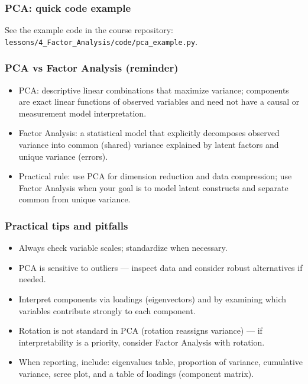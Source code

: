 \documentclass[aspectratio=169]{beamer}
\begin{document}
\begin{frame}[fragile]
\frametitle{PCA: quick code example}
See the example code in the course repository: \texttt{lessons/4\_Factor\_Analysis/code/pca\_example.py}.

\vspace{6pt}

\end{frame}

\begin{frame}
\frametitle{PCA vs Factor Analysis (reminder)}
\begin{itemize}
    \item PCA: descriptive linear combinations that maximize variance; components are exact linear functions of observed variables and need not have a causal or measurement model interpretation. \pause
    \item Factor Analysis: a statistical model that explicitly decomposes observed variance into common (shared) variance explained by latent factors and unique variance (errors). \pause
    \item Practical rule: use PCA for dimension reduction and data compression; use Factor Analysis when your goal is to model latent constructs and separate common from unique variance. \pause
\end{itemize}
\end{frame}

\begin{frame}
\frametitle{Practical tips and pitfalls}
\begin{itemize}
    \item Always check variable scales; standardize when necessary. \pause
    \item PCA is sensitive to outliers — inspect data and consider robust alternatives if needed. \pause
    \item Interpret components via loadings (eigenvectors) and by examining which variables contribute strongly to each component. \pause
    \item Rotation is not standard in PCA (rotation reassigns variance) — if interpretability is a priority, consider Factor Analysis with rotation. \pause
    \item When reporting, include: eigenvalues table, proportion of variance, cumulative variance, scree plot, and a table of loadings (component matrix). \pause
\end{itemize}
\end{frame}
\end{document}
